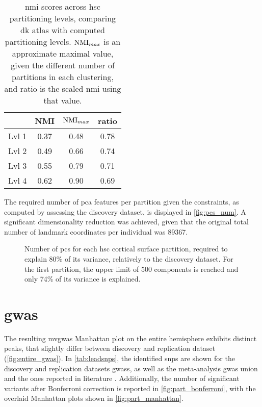 \begin{table}[H]
	\centering
	\begin{tabular}{l|ccc}
		& NMI & $\operatorname*{NMI}_{max}$ & ratio\\
		\hline
		 Lvl 1 & 0.37 & 0.48 & 0.78\\
		 Lvl 2 & 0.49 & 0.66 & 0.74\\
		 Lvl 3 & 0.55 & 0.79 & 0.71\\
		 Lvl 4 & 0.62 & 0.90 & 0.69\\
	\end{tabular}
\caption [\Ac{nmi} scores across \ac{hsc} partitioning levels]{\Ac{nmi} scores across \ac{hsc} partitioning levels, comparing \ac{dk} atlas with computed partitioning levels. $\operatorname*{NMI}_{max}$ is an approximate maximal value, given the different number of partitions in each clustering, and ratio is the scaled \ac{nmi} using that value.}
\label{tab:nmi}
\end{table}
The required number of \ac{pca} features per partition given the constraints, as computed by assessing the discovery dataset, is displayed in \autoref{fig:pcs_num}. A significant dimensionality reduction was achieved, given that the original total number of landmark coordinates per individual was 89367.
\begin{figure}[H]

\caption[Number of PCs per HSC cortical surface partition]{Number of \acp{pc} for each \ac{hsc} cortical surface partition, required to explain 80\% of its variance, relatively to the discovery dataset. For the first partition, the upper limit of 500 components is reached and only 74\% of its variance is explained.}
\label{fig:pcs_num}
\end{figure}
\section{\acs{gwas}}

The resulting \ac{mvgwas} Manhattan plot on the entire hemisphere exhibits distinct peaks, that slightly differ between discovery and replication dataset (\autoref{fig:entire_gwas}). In \autoref{tab:leadsnps}, the identified \acp{snp} are shown for the discovery and replication datasets \acp{gwas}, as well as the meta-analysis \ac{gwas} union and the ones reported in literature \cite{Sha2021}. Additionally, the number of significant variants after Bonferroni correction is reported in \autoref{fig:part_bonferroni}, with the overlaid Manhattan plots shown  in \autoref{fig:part_manhattan}. 

